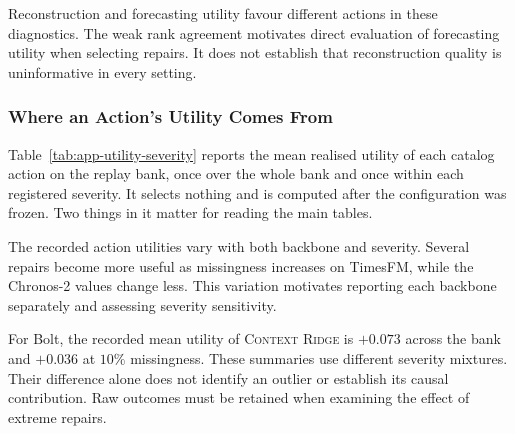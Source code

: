 \documentclass{article}
\begin{document}
Reconstruction and forecasting utility favour different actions in these diagnostics.
The weak rank agreement motivates direct evaluation of forecasting utility when selecting
repairs. It does not establish that reconstruction quality is uninformative in every setting.

\subsubsection{Where an Action's Utility Comes From}
\label{app:utility-by-severity}
Table~\ref{tab:app-utility-severity} reports the mean realised utility of each catalog action
on the replay bank, once over the whole bank and once within each registered severity. It
selects nothing and is computed after the configuration was frozen. Two things in it matter for
reading the main tables.

The recorded action utilities vary with both backbone and severity. Several repairs become
more useful as missingness increases on TimesFM, while the Chronos-2 values change less.
This variation motivates reporting each backbone separately and assessing severity sensitivity.

For Bolt, the recorded mean utility of \textsc{Context Ridge} is $+0.073$ across the bank
and $+0.036$ at $10\%$ missingness. These summaries use different severity mixtures.
Their difference alone does not identify an outlier or establish its causal contribution.
Raw outcomes must be retained when examining the effect of extreme repairs.
\end{document}
